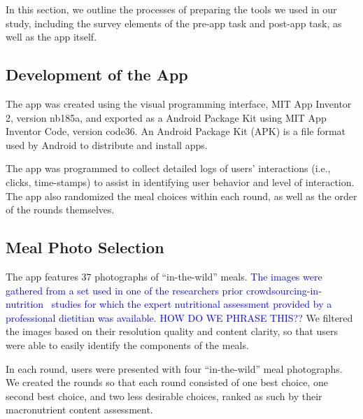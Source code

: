 In this section, we outline the processes of preparing the tools we used in our study, including the survey elements of the pre-app task and post-app task, as well as the app itself.

\subsection{Development of the App}

The app was created using the visual programming interface, MIT App Inventor 2, version nb185a, and exported as a Android Package Kit using MIT App Inventor Code, version code36. An Android Package Kit (APK) is a file format used by Android to distribute and install apps.

The app was programmed to collect detailed logs of users' interactions (i.e., clicks, time-stamps) to assist in identifying user behavior and level of interaction. 
The app also randomized the meal choices within each round, as well as the order of the rounds themselves.



\subsection{Meal Photo Selection}
The app features 37 photographs of ``in-the-wild'' meals.
\textcolor{blue}{The images were gathered from a set used in one of the researchers prior crowdsourcing-in-nutrition~\cite{desai2019personal,mitchell2019wish} studies for which the expert nutritional assessment provided by a professional dietitian was available. HOW DO WE PHRASE THIS??}
We filtered the images based on their resolution quality and content clarity, so that users were able to easily identify the components of the meals.

In each round, users were presented with four ``in-the-wild'' meal photographs.
We created the rounds so that each round consisted of one best choice, one second best choice, and two less desirable choices, ranked as such by their macronutrient content assessment. 

  
